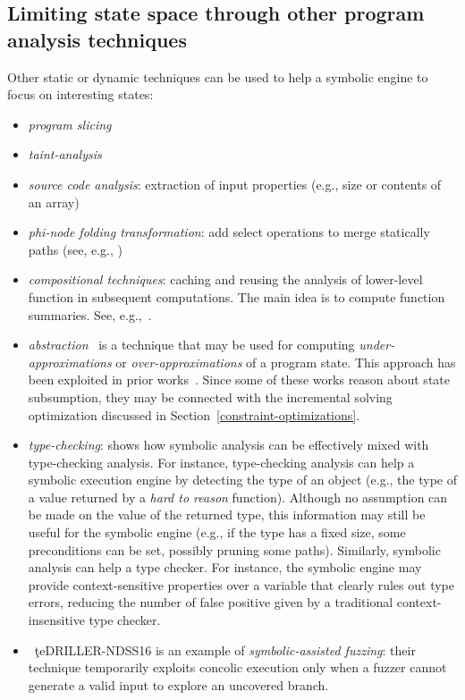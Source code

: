 \subsection{Limiting state space through other program analysis techniques}

Other static or dynamic techniques can be used to help a symbolic engine to focus on interesting states:
\begin{itemize}
  \item {\em program slicing}
  \item {\em taint-analysis}
  \item {\em source code analysis}: extraction of input properties (e.g., size or contents of an array)
  \item {\em phi-node folding transformation}: add select operations to merge statically paths (see, e.g., \cite{CCK-EUROSYS11})
  \item {\em compositional techniques}: caching and reusing the analysis of lower-level function in subsequent computations. The main idea is to compute function summaries. See, e.g.,~\cite{G-POPL07,G-PLDI11,MS-TR07}.
  \item {\em abstraction}~\cite{C-SEFM07} is a technique that may be used for computing {\em under-approximations} or {\em over-approximations} of a program state. This approach has been exploited in prior works~\cite{APV-SPIN06,VPP-ISSTA06,XGM-ISSTA08}. Since some of these works reason about state subsumption, they may be connected with the incremental solving optimization discussed in Section~\ref{constraint-optimizations}.
  \item {\em type-checking}: \cite{KCF-PLDI10} shows how symbolic analysis can be effectively mixed with type-checking analysis. For instance, type-checking analysis can help a symbolic execution engine by detecting the type of an object (e.g., the type of a value returned by a {\em hard to reason} function). Although no assumption can be made on the value of the returned type, this information may still be useful for the symbolic engine (e.g., if the type has a fixed size, some preconditions can be set, possibly pruning some paths). Similarly, symbolic analysis can help a type checker. For instance, the symbolic engine may provide context-sensitive properties over a variable that clearly rules out type errors, reducing the number of false positive given by a traditional context-insensitive type checker.
  \item~\c te{DRILLER-NDSS16} is an example of {\em symbolic-assisted fuzzing}: their technique temporarily exploits concolic execution only when a fuzzer cannot generate a valid input to explore an uncovered branch.
\end{itemize}

